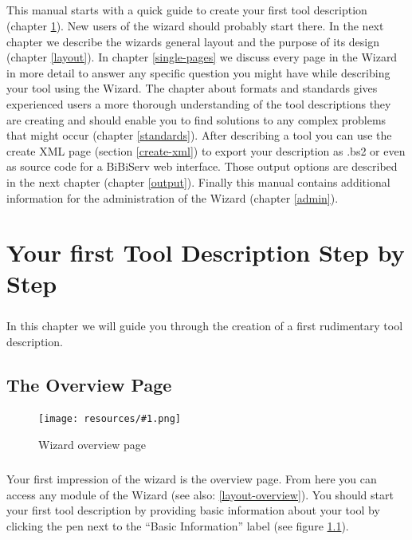 \documentclass[a4paper,10pt]{book}
\newcommand{\bigpic}[1]{\texttt{[image: resources/\#1.png]}}
\begin{document}
\paragraph{} This manual starts with a quick guide to create your first tool description (chapter \ref{quickstart}). New users of the wizard should probably start there. In the next chapter we describe the wizards general layout and the purpose of its design (chapter \ref{layout}). In chapter \ref{single-pages} we discuss every page in the Wizard in more detail to answer any specific question you might have while describing your tool using the Wizard. The chapter about formats and standards gives experienced users a more thorough understanding of the tool descriptions they are creating and should enable you to find solutions to any complex problems that might occur (chapter \ref{standards}). After describing a tool you can use the create XML page (section \ref{create-xml}) to export your description as .bs2 or even as source code for a BiBiServ web interface. Those output options are described in the next chapter (chapter \ref{output}). Finally this manual contains additional information for the administration of the Wizard (chapter \ref{admin}).

\chapter{Your first Tool Description Step by Step}
\label{quickstart}
\paragraph{} In this chapter we will guide you through the creation of a first rudimentary tool description.

\section{The Overview Page}

\begin{figure}
 \bigpic{quickstart-overview}
\caption{Wizard overview page}
\label{quickstart-overview}
\end{figure}

\paragraph{} Your first impression of the wizard is the overview page. From here you can access any module of the Wizard (see also: \ref{layout-overview}). You should start your first tool description by providing basic information about your tool by clicking the pen next to the ``Basic Information'' label (see figure \ref{quickstart-overview}).
\end{document}
